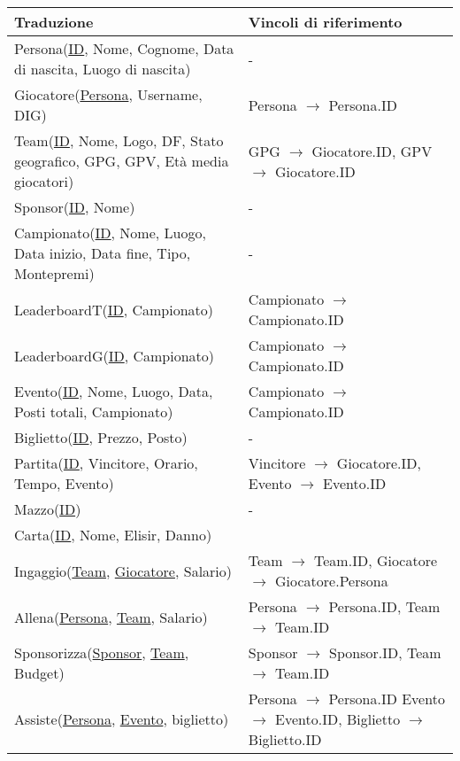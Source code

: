 \documentclass{article}
\begin{document}
\begin{table}
    \centering
    \begin{tabularx}{\textwidth}{|X|X|}
        \hline
        \textbf{Traduzione} & \textbf{Vincoli di riferimento} \\ \hline
        Persona(\underline{ID}, Nome, Cognome, Data di nascita, Luogo di nascita) & - \\ \hline
        Giocatore(\underline{Persona}, Username, DIG) & Persona $\xrightarrow{}$ Persona.ID \\ \hline
        Team(\underline{ID}, Nome, Logo, DF, Stato geografico, GPG, GPV, Età media giocatori) & GPG $\xrightarrow{}$ Giocatore.ID, GPV $\xrightarrow{}$ Giocatore.ID \\ \hline
        Sponsor(\underline{ID}, Nome) & - \\ \hline
        Campionato(\underline{ID}, Nome, Luogo, Data inizio, Data fine, Tipo, Montepremi) & - \\ \hline
        LeaderboardT(\underline{ID}, Campionato) & Campionato $\xrightarrow{}$ Campionato.ID \\ \hline
        LeaderboardG(\underline{ID}, Campionato) & Campionato $\xrightarrow{}$ Campionato.ID \\ \hline
        Evento(\underline{ID}, Nome, Luogo, Data, Posti totali, Campionato) & Campionato $\xrightarrow{}$ Campionato.ID \\ \hline
        Biglietto(\underline{ID}, Prezzo, Posto) & - \\ \hline
        Partita(\underline{ID}, Vincitore, Orario, Tempo, Evento) & Vincitore $\xrightarrow{}$ Giocatore.ID, Evento $\xrightarrow{}$ Evento.ID \\ \hline
        Mazzo(\underline{ID}) & - \\ \hline %
        Carta(\underline{ID}, Nome, Elisir, Danno) & \\ \hline
        Ingaggio(\underline{Team}, \underline{Giocatore}, Salario) & Team $\xrightarrow{}$ Team.ID, Giocatore $\xrightarrow{}$ Giocatore.Persona \\ \hline %
        Allena(\underline{Persona}, \underline{Team}, Salario) & Persona $\xrightarrow{}$ Persona.ID, Team $\xrightarrow{}$ Team.ID \\ \hline
        Sponsorizza(\underline{Sponsor}, \underline{Team}, Budget) & Sponsor $\xrightarrow{}$ Sponsor.ID, Team $\xrightarrow{}$ Team.ID \\ \hline
        Assiste(\underline{Persona}, \underline{Evento}, biglietto) & Persona $\xrightarrow{}$ Persona.ID Evento $\xrightarrow{}$ Evento.ID, Biglietto $\xrightarrow{}$ Biglietto.ID \\ \hline

\end{tabularx}
\end{table}
\end{document}
